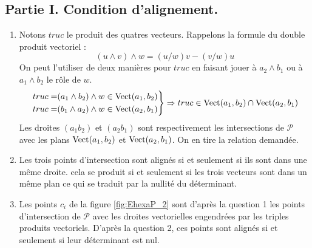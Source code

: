 \subsection*{Partie I. Condition d'alignement.}
\begin{enumerate}
 \item Notons $truc$ le produit des quatres vecteurs. Rappelons la formule du double produit vectoriel :
\begin{displaymath}
 (u\wedge v) \wedge w = (u/w) v - (v/w)u
\end{displaymath}
 On peut l'utiliser de deux manières pour $truc$ en faisant jouer à $a_2\wedge b_1$ ou à $a_1\wedge b_2$ le rôle de $w$. 
\begin{displaymath}
\left. 
\begin{aligned}
 truc =& (a_1\wedge b_2)\wedge w \in \operatorname{Vect}(a_1,b_2) \\
 truc =& (b_1\wedge a_2)\wedge w \in \operatorname{Vect}(a_2,b_1)
\end{aligned}
\right\rbrace 
\Rightarrow
truc \in \operatorname{Vect}(a_1,b_2) \cap \operatorname{Vect}(a_2,b_1)
\end{displaymath}
Les droites $(a_1b_2)$ et $(a_2b_1)$ sont respectivement les intersections de $\mathcal P$ avec les plans $\operatorname{Vect}(a_1,b_2)$ et $\operatorname{Vect}(a_2,b_1)$. On en tire la relation demandée.
\item Les trois points d'intersection sont alignés si et seulement si ils sont dans une même droite. cela se produit si et seulement si les trois vecteurs sont dans un même plan ce qui se traduit par la nullité du déterminant.
\item Les points $c_i$ de la figure \ref{fig:EhexaP_2} sont d'après la question 1 les points d'intersection de $\mathcal P$ avec les droites vectorielles engendrées par les triples produits vectoriels. D'après la question 2, ces points sont alignés si et seulement si leur déterminant est nul. 
\end{enumerate}

